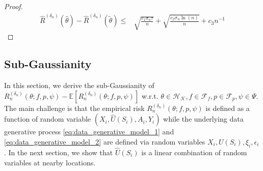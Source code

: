 \documentclass[12pt]{article}
\newcommand{\E}{\mathbb{E}}
\begin{document}
\begin{proof}
\begin{align*}
   \widehat R^{({\delta_n})}(\widehat\theta) - \widehat R^{({\delta_n})}(\tilde\theta)\leq & \sqrt{\frac{c_1\sigma_n\tau}{n}} + \sqrt{\frac{ c_2\sigma_n\ln(n)}{n}}  + c_3n^{-1}
\end{align*}



\end{proof}


\subsection{Sub-Gaussianity}\label{sec:sub-gaussianity}

In this section, we derive the sub-Gaussianity of $R_n^{(\delta_n)}(\theta;f,p,\psi)-\E[R_n^{(\delta_n)}(\theta;f,p,\psi)]$ w.r.t. $\theta\in\mathcal{H}_\mathcal{K}, f\in\mathcal{F}_f, p\in\mathcal{F}_p, \psi\in\Psi$. The main challenge is that the empirical risk $R_n^{(\delta_n)}(\theta;f,p,\psi)$ is defined as a function of random variable $(X_i,\widehat U(S_i), A_i, Y_i)$ while the underlying data generative process \eqref{eq:data_generative_model_1} and \eqref{eq:data_generative_model_2} are defined via random variables $X_i,U(S_i), \xi_i,\epsilon_i$. In the next section, we show that $\widehat U(S_i)$ is a linear combination of random variables at nearby locations.
\end{document}
